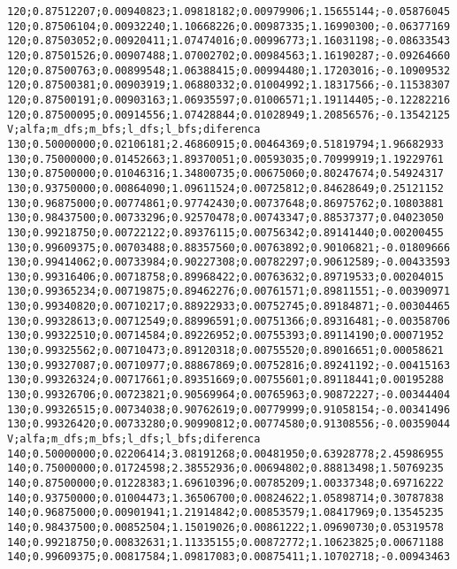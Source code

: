 \documentclass[brazil,times]{abnt}
\begin{document}
{\begin{verbatim}
120;0.87512207;0.00940823;1.09818182;0.00979906;1.15655144;-0.05876045
120;0.87506104;0.00932240;1.10668226;0.00987335;1.16990300;-0.06377169
120;0.87503052;0.00920411;1.07474016;0.00996773;1.16031198;-0.08633543
120;0.87501526;0.00907488;1.07002702;0.00984563;1.16190287;-0.09264660
120;0.87500763;0.00899548;1.06388415;0.00994480;1.17203016;-0.10909532
120;0.87500381;0.00903919;1.06880332;0.01004992;1.18317566;-0.11538307
120;0.87500191;0.00903163;1.06935597;0.01006571;1.19114405;-0.12282216
120;0.87500095;0.00914556;1.07428844;0.01028949;1.20856576;-0.13542125
V;alfa;m_dfs;m_bfs;l_dfs;l_bfs;diferenca
130;0.50000000;0.02106181;2.46860915;0.00464369;0.51819794;1.96682933
130;0.75000000;0.01452663;1.89370051;0.00593035;0.70999919;1.19229761
130;0.87500000;0.01046316;1.34800735;0.00675060;0.80247674;0.54924317
130;0.93750000;0.00864090;1.09611524;0.00725812;0.84628649;0.25121152
130;0.96875000;0.00774861;0.97742430;0.00737648;0.86975762;0.10803881
130;0.98437500;0.00733296;0.92570478;0.00743347;0.88537377;0.04023050
130;0.99218750;0.00722122;0.89376115;0.00756342;0.89141440;0.00200455
130;0.99609375;0.00703488;0.88357560;0.00763892;0.90106821;-0.01809666
130;0.99414062;0.00733984;0.90227308;0.00782297;0.90612589;-0.00433593
130;0.99316406;0.00718758;0.89968422;0.00763632;0.89719533;0.00204015
130;0.99365234;0.00719875;0.89462276;0.00761571;0.89811551;-0.00390971
130;0.99340820;0.00710217;0.88922933;0.00752745;0.89184871;-0.00304465
130;0.99328613;0.00712549;0.88996591;0.00751366;0.89316481;-0.00358706
130;0.99322510;0.00714584;0.89226952;0.00755393;0.89114190;0.00071952
130;0.99325562;0.00710473;0.89120318;0.00755520;0.89016651;0.00058621
130;0.99327087;0.00710977;0.88867869;0.00752816;0.89241192;-0.00415163
130;0.99326324;0.00717661;0.89351669;0.00755601;0.89118441;0.00195288
130;0.99326706;0.00723821;0.90569964;0.00765963;0.90872227;-0.00344404
130;0.99326515;0.00734038;0.90762619;0.00779999;0.91058154;-0.00341496
130;0.99326420;0.00733280;0.90990812;0.00774580;0.91308556;-0.00359044
V;alfa;m_dfs;m_bfs;l_dfs;l_bfs;diferenca
140;0.50000000;0.02206414;3.08191268;0.00481950;0.63928778;2.45986955
140;0.75000000;0.01724598;2.38552936;0.00694802;0.88813498;1.50769235
140;0.87500000;0.01228383;1.69610396;0.00785209;1.00337348;0.69716222
140;0.93750000;0.01004473;1.36506700;0.00824622;1.05898714;0.30787838
140;0.96875000;0.00901941;1.21914842;0.00853579;1.08417969;0.13545235
140;0.98437500;0.00852504;1.15019026;0.00861222;1.09690730;0.05319578
140;0.99218750;0.00832631;1.11335155;0.00872772;1.10623825;0.00671188
140;0.99609375;0.00817584;1.09817083;0.00875411;1.10702718;-0.00943463

\end{verbatim}}
\end{document}
